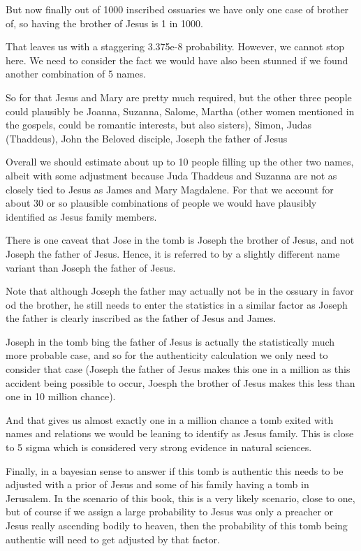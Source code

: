 But now finally out of 1000 inscribed ossuaries we have only one case of brother of, so having the brother of Jesus is 1 in 1000.

That leaves us with a staggering 3.375e-8 probability.
However, we cannot stop here.
We need to consider the fact we would have also been stunned if we found another combination of 5 names.

So for that Jesus and Mary are pretty much required, but the other three people could plausibly be Joanna, Suzanna, Salome, Martha (other women mentioned in the gospels, could be romantic interests, but also sisters), Simon, Judas (Thaddeus), John the Beloved disciple, Joseph the father of Jesus

Overall we should estimate about up to 10 people filling up the other two names, albeit with some adjustment because Juda Thaddeus and Suzanna are not as closely tied to Jesus as James and Mary Magdalene.
For that we account for about 30 or so plausible combinations of people we would have plausibly identified as Jesus family members.

There is one caveat that Jose in the tomb is Joseph the brother of Jesus, and not Joseph the father of Jesus.
Hence, it is referred to by a slightly different name variant than Joseph the father of Jesus.

Note that although Joseph the father may actually not be in the ossuary in favor od the brother, he still needs to enter the statistics in a similar factor as Joseph the father is clearly inscribed as the father of Jesus and James.

Joseph in the tomb bing the father of Jesus is actually the statistically much more probable case, and so for the authenticity calculation we only need to consider that case (Joseph the father of Jesus makes this one in a million as this accident being possible to occur, Joesph the brother of Jesus makes this less than one in 10 million chance).

And that gives us almost exactly one in a million chance a tomb exited with names and relations we would be leaning to identify as Jesus family.
This is close to 5 sigma which is considered very strong evidence in natural sciences.

Finally, in a bayesian sense to answer if this tomb is authentic this needs to be adjusted with a prior of Jesus and some of his family having a tomb in Jerusalem.
In the scenario of this book, this is a very likely scenario, close to one, but of course if we assign a large probability to Jesus was only a preacher or Jesus really ascending bodily to heaven, then the probability of this tomb being authentic will need to get adjusted by that factor.

